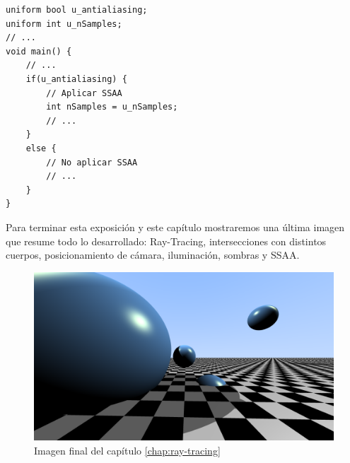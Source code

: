 \begin{lstlisting}
uniform bool u_antialiasing;
uniform int u_nSamples;
// ...
void main() {
    // ... 
    if(u_antialiasing) {
        // Aplicar SSAA
        int nSamples = u_nSamples;
        // ... 
    }
    else {
        // No aplicar SSAA
        // ...
    }
}   
\end{lstlisting}

Para terminar esta exposición y este capítulo mostraremos una última imagen que resume todo lo desarrollado: Ray-Tracing, intersecciones con distintos cuerpos, posicionamiento de cámara, iluminación, sombras y SSAA.

\begin{figure} [ht]
    \centering
    \includegraphics[width=12cm]{img/C8/imagen-final.png}
    \caption{Imagen final del capítulo \ref{chap:ray-tracing}}
    \label{fig:imagen-final}
\end{figure}

